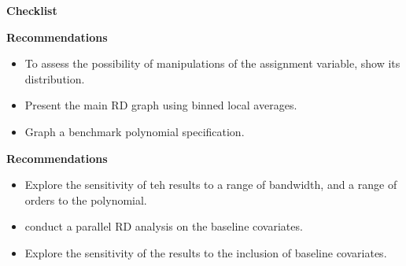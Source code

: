 \begin{frame}\begin{center}
		\LARGE\textbf{Checklist}
\end{center}\end{frame}
\begin{frame}\textbf{Recommendations}\vspace{0.3cm}

\begin{itemize}\setlength\itemsep{1em}
\item To assess the possibility of manipulations of the assignment variable, show its distribution.
\item Present the main RD graph using binned local averages.
\item Graph a benchmark polynomial specification.
\end{itemize}

\end{frame}
\begin{frame}\textbf{Recommendations}\vspace{0.3cm}

\begin{itemize}\setlength\itemsep{1em}
\item Explore the sensitivity of teh results to a range of bandwidth, and a range of orders to the polynomial.
\item conduct a parallel RD analysis on the baseline covariates.
\item Explore the sensitivity of the results to the inclusion of baseline covariates.
\end{itemize}

\end{frame}
